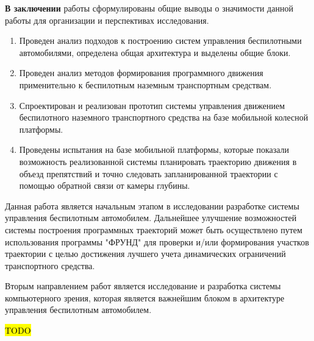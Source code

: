 \textbf{В заключении} работы сформулированы общие выводы о значимости данной работы для
организации и перспективах исследования.

\begin{enumerate}
    \item Проведен анализ подходов к построению систем управления беспилотными
          автомобилями, определена общая архитектура и выделены общие блоки.
    \item Проведен анализ методов формирования программного движения применительно к беспилотным наземным транспортным
          средствам.
    \item Спроектирован и реализован прототип системы управления движением беспилотного
          наземного транспортного средства на базе мобильной колесной платформы.
    \item Проведены испытания на базе мобильной платформы, которые показали возможность
          реализованной системы планировать траекторию движения в объезд препятствий и
          точно следовать запланированной траектории с помощью обратной связи от камеры глубины.

\end{enumerate}

Данная работа является начальным этапом в исследовании разработке системы управления
беспилотным автомобилем.
Дальнейшее улучшение возможностей системы построения программных траекторий может быть осуществлено путем использования
программы "ФРУНД" для проверки и/или формирования участков траектории с целью достижения лучшего учета динамических
ограничений транспортного средства.

Вторым направлением работ является исследование и разработка системы компьютерного зрения,
которая является важнейшим блоком в архитектуре управления беспилотным автомобилем.

\hl{TODO}

